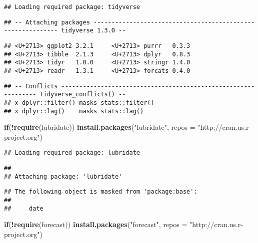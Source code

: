 \documentclass[
]{article}
\newenvironment{Shaded}{\begin{snugshade}}{\end{snugshade}}
\newcommand{\ControlFlowTok}[1]{\textcolor[rgb]{0.13,0.29,0.53}{\textbf{#1}}}
\newcommand{\DataTypeTok}[1]{\textcolor[rgb]{0.13,0.29,0.53}{#1}}
\newcommand{\KeywordTok}[1]{\textcolor[rgb]{0.13,0.29,0.53}{\textbf{#1}}}
\newcommand{\NormalTok}[1]{#1}
\newcommand{\OperatorTok}[1]{\textcolor[rgb]{0.81,0.36,0.00}{\textbf{#1}}}
\newcommand{\StringTok}[1]{\textcolor[rgb]{0.31,0.60,0.02}{#1}}
\begin{document}
\begin{verbatim}
## Loading required package: tidyverse
\end{verbatim}

\begin{verbatim}
## -- Attaching packages ------------------------------------------------------------ tidyverse 1.3.0 --
\end{verbatim}

\begin{verbatim}
## <U+2713> ggplot2 3.2.1     <U+2713> purrr   0.3.3
## <U+2713> tibble  2.1.3     <U+2713> dplyr   0.8.3
## <U+2713> tidyr   1.0.0     <U+2713> stringr 1.4.0
## <U+2713> readr   1.3.1     <U+2713> forcats 0.4.0
\end{verbatim}

\begin{verbatim}
## -- Conflicts --------------------------------------------------------------- tidyverse_conflicts() --
## x dplyr::filter() masks stats::filter()
## x dplyr::lag()    masks stats::lag()
\end{verbatim}

\begin{Shaded}
\begin{Highlighting}[]
\ControlFlowTok{if}\NormalTok{(}\OperatorTok{!}\KeywordTok{require}\NormalTok{(lubridate)) }\KeywordTok{install.packages}\NormalTok{(}\StringTok{"lubridate"}\NormalTok{, }\DataTypeTok{repos =} \StringTok{"http://cran.us.r-project.org"}\NormalTok{)}
\end{Highlighting}
\end{Shaded}

\begin{verbatim}
## Loading required package: lubridate
\end{verbatim}

\begin{verbatim}
## 
## Attaching package: 'lubridate'
\end{verbatim}

\begin{verbatim}
## The following object is masked from 'package:base':
## 
##     date
\end{verbatim}

\begin{Shaded}
\begin{Highlighting}[]
\ControlFlowTok{if}\NormalTok{(}\OperatorTok{!}\KeywordTok{require}\NormalTok{(forecast)) }\KeywordTok{install.packages}\NormalTok{(}\StringTok{"forecast"}\NormalTok{, }\DataTypeTok{repos =} \StringTok{"http://cran.us.r-project.org"}\NormalTok{)}
\end{Highlighting}
\end{Shaded}
\end{document}
